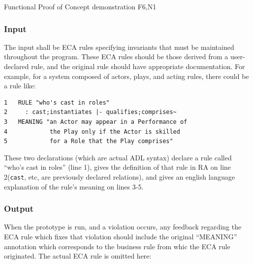 \documentclass[12pt]{report}
\begin{document}

{Functional}
{Proof of Concept demonstration}
{F6,N1}


\vspace{-12pt}\subsubsection*{Input}

The input shall be ECA rules specifying invariants that must be maintained
throughout the program. These ECA rules should be those derived from a
user-declared rule, and the original rule should have appropriate documentation.
For example, for a system composed of actors, plays, and acting rules, there
could be a rule like:

\begin{verbatim}
1   RULE "who's cast in roles" 
2     : cast;instantiates |- qualifies;comprises~
3   MEANING "an Actor may appear in a Performance of 
4            the Play only if the Actor is skilled
5            for a Role that the Play comprises"
\end{verbatim}

These two declarations (which are actual ADL syntax) declare a rule called
``who's cast in roles'' (line 1), gives the definition of that rule in RA on line 2(\verb|cast|,
etc, are previously declared relations), and gives an english language
explanation of the rule's meaning on lines 3-5.

\vspace{-12pt}\subsubsection*{Output}

When the prototype is run, and a violation occurs, any feedback regarding the
ECA rule which fixes that violation should include the original ``MEANING''
annotation which corresponds to the business rule from whic the ECA rule originated.
The actual ECA rule is omitted here:
\end{document}
